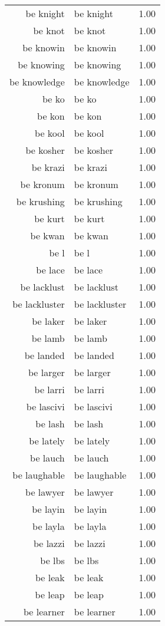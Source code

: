 \begin{table}[ht]
\begin{tabular}{rlr}
  be knight & be knight & 1.00 \\ 
  be knot & be knot & 1.00 \\ 
  be knowin & be knowin & 1.00 \\ 
  be knowing & be knowing & 1.00 \\ 
  be knowledge & be knowledge & 1.00 \\ 
  be ko & be ko & 1.00 \\ 
  be kon & be kon & 1.00 \\ 
  be kool & be kool & 1.00 \\ 
  be kosher & be kosher & 1.00 \\ 
  be krazi & be krazi & 1.00 \\ 
  be kronum & be kronum & 1.00 \\ 
  be krushing & be krushing & 1.00 \\ 
  be kurt & be kurt & 1.00 \\ 
  be kwan & be kwan & 1.00 \\ 
  be l & be l & 1.00 \\ 
  be lace & be lace & 1.00 \\ 
  be lacklust & be lacklust & 1.00 \\ 
  be lackluster & be lackluster & 1.00 \\ 
  be laker & be laker & 1.00 \\ 
  be lamb & be lamb & 1.00 \\ 
  be landed & be landed & 1.00 \\ 
  be larger & be larger & 1.00 \\ 
  be larri & be larri & 1.00 \\ 
  be lascivi & be lascivi & 1.00 \\ 
  be lash & be lash & 1.00 \\ 
  be lately & be lately & 1.00 \\ 
  be lauch & be lauch & 1.00 \\ 
  be laughable & be laughable & 1.00 \\ 
  be lawyer & be lawyer & 1.00 \\ 
  be layin & be layin & 1.00 \\ 
  be layla & be layla & 1.00 \\ 
  be lazzi & be lazzi & 1.00 \\ 
  be lbs & be lbs & 1.00 \\ 
  be leak & be leak & 1.00 \\ 
  be leap & be leap & 1.00 \\ 
  be learner & be learner & 1.00 \\ 

\end{tabular}
\end{table}
